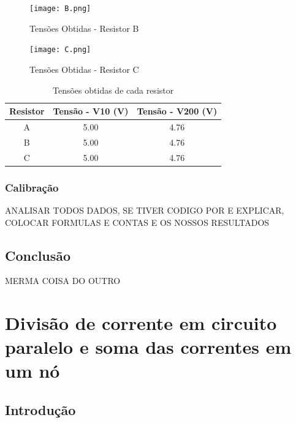 \documentclass[a4paper,12pt]{article}
\begin{document}
\begin{figure}[H]
    \centering
    \texttt{[image: B.png]} %
    \caption{Tensões Obtidas - Resistor B}
    \label{fig:arduino}
\end{figure}

\vspace{1em}

\begin{figure}[H]
    \centering
    \texttt{[image: C.png]} %
    \caption{Tensões Obtidas - Resistor C}
    \label{fig:arduino}
\end{figure}

\vspace{1em}


\begin{table}[ht]
\centering
\begin{tabular}{|c|c|c|}
\hline
\textbf{Resistor} & \textbf{Tensão - V10 (V)} & \textbf{Tensão - V200 (V)} \\
\hline
A & 5.00 & 4.76 \\
\hline
B & 5.00 & 4.76 \\
\hline
C & 5.00 & 4.76 \\
\hline
\end{tabular}
\caption{Tensões obtidas de cada resistor}
\end{table}

\vspace{1em}

\subsubsection{Calibração}
\leavevmode

ANALISAR TODOS DADOS, SE TIVER CODIGO POR E EXPLICAR, COLOCAR FORMULAS E CONTAS E OS NOSSOS RESULTADOS

\subsection{Conclusão}
\leavevmode

MERMA COISA DO OUTRO

\section{Divisão de corrente em circuito paralelo e soma das correntes em um nó}

\subsection{Introdução}
\leavevmode
\end{document}
